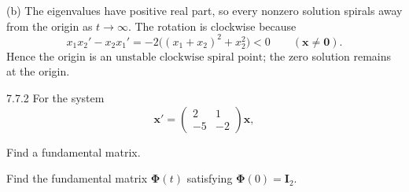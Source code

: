 \documentclass[11pt,oneside]{article}
\begin{document}
\begin{solution}
\medskip
\noindent\textup{(b)} The eigenvalues have positive real part, so every nonzero solution spirals away from the origin as $t\to\infty$. The rotation is clockwise because
\[
    x_1x_2'-x_2x_1'
    =-2\bigl((x_1+x_2)^2+x_2^2\bigr)<0
    \qquad (\mathbf{x}\ne\mathbf{0}).
\]
Hence the origin is an \(\boxed{\text{unstable clockwise spiral point}}\); the zero solution remains at the origin.
\end{solution}

\begin{problem}{7.7.2}
For the system
\[
    \mathbf{x}'=
    \begin{pmatrix}
        2&1\\
        -5&-2
    \end{pmatrix}\mathbf{x},
\]
\begin{problemsubparts}
    \item Find a fundamental matrix.
    \item Find the fundamental matrix $\boldsymbol{\Phi}(t)$ satisfying $\boldsymbol{\Phi}(0)=\mathbf{I}_2$.
\end{problemsubparts}
\end{problem}
\end{document}
